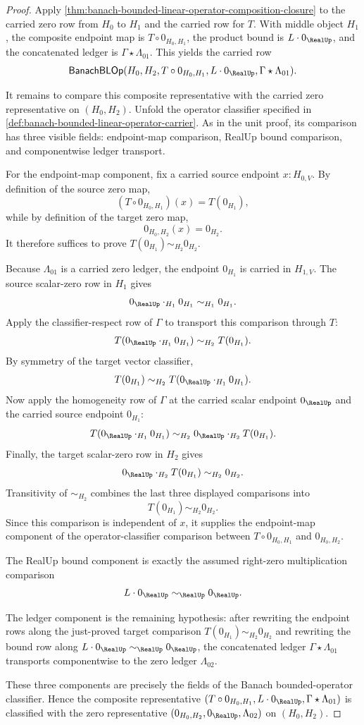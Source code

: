 \begin{proof}
Apply \autoref{thm:banach-bounded-linear-operator-composition-closure} to the carried zero row from $H_0$ to $H_1$ and the carried row for $T$. With middle object $H_1$, the composite endpoint map is $T\circ 0_{H_0,H_1}$, the product bound is $L\cdot 0_{\RealUp}$, and the concatenated ledger is $\Gamma\star\Lambda_{01}$. This yields the carried row
$$
\mathsf{BanachBLOp}(H_0,H_2,T\circ 0_{H_0,H_1},L\cdot 0_{\RealUp},\Gamma\star\Lambda_{01}).
$$

It remains to compare this composite representative with the carried zero representative on $(H_0,H_2)$. Unfold the operator classifier specified in \autoref{def:banach-bounded-linear-operator-carrier}. As in the unit proof, its comparison has three visible fields: endpoint-map comparison, RealUp bound comparison, and componentwise ledger transport.

For the endpoint-map component, fix a carried source endpoint $x:H_{0,V}$. By definition of the source zero map,
$$
(T\circ 0_{H_0,H_1})(x)=T(0_{H_1}),
$$
while by definition of the target zero map,
$$
0_{H_0,H_2}(x)=0_{H_2}.
$$
It therefore suffices to prove $T(0_{H_1})\sim_{H_2}0_{H_2}$.

Because $\Lambda_{01}$ is a carried zero ledger, the endpoint $0_{H_1}$ is carried in $H_{1,V}$. The source scalar-zero row in $H_1$ gives
$$
0_{\RealUp}\cdot_{H_1}0_{H_1}\sim_{H_1}0_{H_1}.
$$
Apply the classifier-respect row of $\Gamma$ to transport this comparison through $T$:
$$
T(0_{\RealUp}\cdot_{H_1}0_{H_1})\sim_{H_2}T(0_{H_1}).
$$
By symmetry of the target vector classifier,
$$
T(0_{H_1})\sim_{H_2}T(0_{\RealUp}\cdot_{H_1}0_{H_1}).
$$
Now apply the homogeneity row of $\Gamma$ at the carried scalar endpoint $0_{\RealUp}$ and the carried source endpoint $0_{H_1}$:
$$
T(0_{\RealUp}\cdot_{H_1}0_{H_1})\sim_{H_2}0_{\RealUp}\cdot_{H_2}T(0_{H_1}).
$$
Finally, the target scalar-zero row in $H_2$ gives
$$
0_{\RealUp}\cdot_{H_2}T(0_{H_1})\sim_{H_2}0_{H_2}.
$$
Transitivity of $\sim_{H_2}$ combines the last three displayed comparisons into
$$
T(0_{H_1})\sim_{H_2}0_{H_2}.
$$
Since this comparison is independent of $x$, it supplies the endpoint-map component of the operator-classifier comparison between $T\circ 0_{H_0,H_1}$ and $0_{H_0,H_2}$.

The RealUp bound component is exactly the assumed right-zero multiplication comparison
$$
L\cdot 0_{\RealUp}\sim_{\RealUp}0_{\RealUp}.
$$

The ledger component is the remaining hypothesis: after rewriting the endpoint rows along the just-proved target comparison $T(0_{H_1})\sim_{H_2}0_{H_2}$ and rewriting the bound row along $L\cdot 0_{\RealUp}\sim_{\RealUp}0_{\RealUp}$, the concatenated ledger $\Gamma\star\Lambda_{01}$ transports componentwise to the zero ledger $\Lambda_{02}$.

These three components are precisely the fields of the Banach bounded-operator classifier. Hence the composite representative $(T\circ 0_{H_0,H_1},L\cdot 0_{\RealUp},\Gamma\star\Lambda_{01})$ is classified with the zero representative $(0_{H_0,H_2},0_{\RealUp},\Lambda_{02})$ on $(H_0,H_2)$.
\end{proof}


